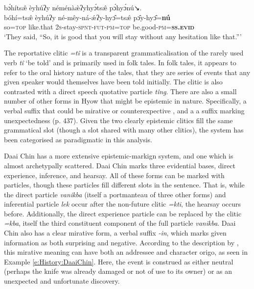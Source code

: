 \begin{exe}
\ex\label{e:History:Hyow}
\glll bɔ́hítsæ̂ èyhúʔy néménàæ̀ʔyhyɔ́tsæ̂ pɔ́hyɔ́nú↘. \\
bóhí=tsæ̂ èyhúʔy né-mêy-ná-ǽʔy-hyɔ̂=tsæ̂ pɔ̂y-hyɔ̂=\textbf{nú} \\
so=\textsc{top} like.that \textsc{2s}-stay-\textsc{spnt-fut-pm=top} be.good\textsc{-pm=\textbf{ss.evid}} \\
\glt `They said, ``So, it is good that you will stay without any hesitation like that.''' \cite[487]{Zakaria2018}
\end{exe}

The reportative clitic \textit{=tî} is a transparent grammaticalisation of the rarely used verb \textit{tî} `be told' and is primarily used in folk tales. In folk tales, it appears to refer to the oral history nature of the tales, that they are series of events that any given speaker would themselves have been told initially. The clitic is also contrasted with a direct speech quotative particle \textit{tîng}. There are also a small number of other forms in Hyow that might be epistemic in nature. Specifically, a verbal suffix that could be mirative or counterexpective \cite[440]{Zakaria2018}, and a a suffix marking unexpectedness (p. 437). Given the two clearly epistemic clitics fill the same grammatical slot (though a slot shared with many other clitics), the system has been categorised as paradigmatic in this analysis.

Daai Chin \cite[Kukish: Myanmar,][294]{SoHartmann2009} has a more extensive epistemic-markign system, and one which is almost archetypally scattered. Daai Chin marks three evidential bases, direct experience, inference, and hearsay. All of these forms can be marked with particles, though these particles fill different slots in the sentence. That is, while the direct particle \textit{vanikba} (itself a portmanteau of three other forms) and inferential particle \textit{lek} occur after the non-future clitic \textit{=kti}, the hearsay occurs before. Additionally, the direct experience particle can be replaced by the clitic \textit{=kba}, itself the third constituent component of the full particle \textit{vanikba}. Daai Chin also has a clear mirative form, a verbal suffix \textit{-in}, which marks given information as both surprising and negative. According to the description by , this mirative meaning can have both an addressee and character origo, as seen in Example \ref{e:History:DaaiChin}. Here, the event is construed as either neutral (perhaps the knife was already damaged or not of use to its owner) or as an unexpected and unfortunate discovery.

